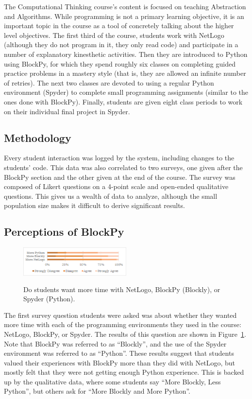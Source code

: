 \documentclass{sig-alternate}
\begin{document}
The Computational Thinking course's content is focused on teaching Abstraction and Algorithms.
While programming is not a primary learning objective, it is an important topic in the course as a tool of concretely talking about the higher level objectives.
The first third of the course, students work with NetLogo (although they do not program in it, they only read code) and participate in a number of explanatory kinesthetic activities.
Then they are introduced to Python using BlockPy, for which they spend roughly six classes on completing guided practice problems in a mastery style (that is, they are allowed an infinite number of retries).
The next two classes are devoted to using a regular Python environment (Spyder) to complete small programming assignments (similar to the ones done with BlockPy).
Finally, students are given eight class periods to work on their individual final project in Spyder.

\subsection{Methodology}

Every student interaction was logged by the system, including changes to the students' code.
This data was also correlated to two surveys, one given after the BlockPy section and the other given at the end of the course.
The survey was composed of Likert questions on a 4-point scale and open-ended qualitative questions.
This gives us a wealth of data to analyze, although the small population size makes it difficult to derive significant results.

\subsection{Perceptions of BlockPy}

\begin{figure}
\includegraphics[width=0.5\textwidth]{images/surveyMore}
\label{fig-want-more}
\caption{Do students want more time with NetLogo, BlockPy (Blockly), or Spyder (Python).}
\end{figure}

The first survey question students were asked was about whether they wanted more time with each of the programming environments they used in the course: NetLogo, BlockPy, or Spyder.
The results of this question are shown in Figure~\ref{fig-want-more}.
Note that BlockPy was referred to as ``Blockly'', and the use of the Spyder environment was referred to as ``Python''.
These results suggest that students valued their experiences with BlockPy more than they did with NetLogo, but mostly felt that they were not getting enough Python experience. 
This is backed up by the qualitative data, where some students say ``More Blockly, Less Python'', but others ask for ``More Blockly and More Python''.
\end{document}
